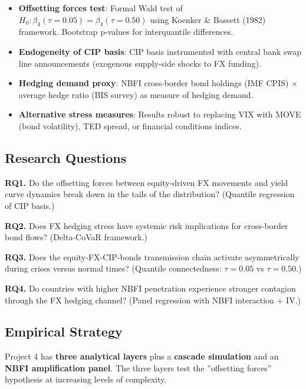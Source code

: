 \documentclass[11pt,a4paper]{article}
\begin{document}
\begin{itemize}
\item \textbf{Offsetting forces test}: Formal Wald test of $H_0: \beta_4(\tau=0.05) = \beta_4(\tau=0.50)$ using Koenker \& Bassett (1982) framework. Bootstrap p-values for interquantile differences.
\item \textbf{Endogeneity of CIP basis}: CIP basis instrumented with central bank swap line announcements (exogenous supply-side shocks to FX funding).
\item \textbf{Hedging demand proxy}: NBFI cross-border bond holdings (IMF CPIS) $\times$ average hedge ratio (BIS survey) as measure of hedging demand.
\item \textbf{Alternative stress measures}: Results robust to replacing VIX with MOVE (bond volatility), TED spread, or financial conditions indices.

\end{itemize}

\subsection{Research Questions}

\textbf{RQ1.} Do the offsetting forces between equity-driven FX movements and yield
curve dynamics break down in the tails of the distribution? (Quantile regression
of CIP basis.)

\textbf{RQ2.} Does FX hedging stress have systemic risk implications for cross-border
bond flows? (Delta-CoVaR framework.)

\textbf{RQ3.} Does the equity-FX-CIP-bonds transmission chain activate asymmetrically
during crises versus normal times? (Quantile connectedness: $\tau = 0.05$ vs $\tau = 0.50$.)

\textbf{RQ4.} Do countries with higher NBFI penetration experience stronger contagion
through the FX hedging channel? (Panel regression with NBFI interaction + IV.)


\subsection{Empirical Strategy}

Project 4 has \textbf{three analytical layers} plus a \textbf{cascade simulation} and an \textbf{NBFI amplification panel}. The three layers test the ''offsetting forces'' hypothesis at increasing levels of complexity.
\end{document}
